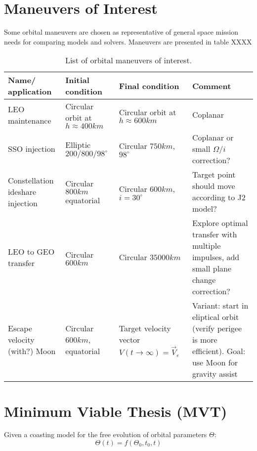 \section{Maneuvers of Interest}

Some orbital maneuvers are chosen as representative of general space mission needs for comparing models and solvers. Maneuvers are presented in table XXXX 

\begin{table}
    \centering
    \begin{tabular}{>{\centering\arraybackslash}m{3cm}>{\centering\arraybackslash}m{3cm}>{\centering\arraybackslash}m{3cm}>{\centering\arraybackslash}m{3cm}}\toprule
        \textbf{Name/ application} & \textbf{Initial condition} & \textbf{Final condition} & \textbf{Comment}\\ \midrule
        LEO maintenance & Circular orbit at \(h \approx 400km\) & Circular orbit at \(h \approx 600km\) & Coplanar \\ \midrule
        SSO injection & Elliptic \(200/800/98^\circ\) & Circular \(750km\), \(98^\circ \) & Coplanar or small \(\Omega\)/\(i\) correction? \\ \midrule
        Constellation ideshare injection & Circular \(800km\) equatorial & Circular \(600km\), \(i=30^\circ\) & Target point should move according to J2 model? \\ \midrule
        LEO to GEO transfer & Circular \(600km\) & Circular \(35000km\) & Explore optimal transfer with multiple impulses, add small plane change correction? \\ \midrule
        Escape velocity (with?) Moon & Circular \(600km\), equatorial & Target velocity vector \(V(t \rightarrow \infty) = \vec{V}_e\) & Variant: start in eliptical orbit (verify perigee is more efficient). Goal: use Moon for gravity assist \\ \bottomrule
    \end{tabular}
    \caption{List of orbital maneuvers of interest.}\label{tab:man_interest}
\end{table}

\section{Minimum Viable Thesis (MVT)}

Given a coasting model for the free evolution of orbital parameters \(\Theta\):
\begin{equation} \label{eq:coasting}
    \Theta(t) = f(\Theta_0, t_0, t)
\end{equation}

